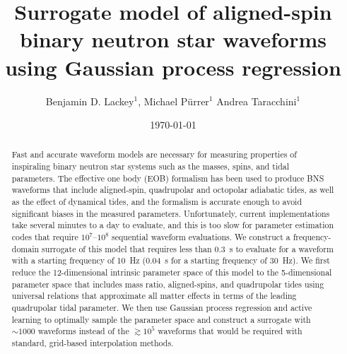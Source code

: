 \documentclass[prd,aps,letter,twocolumn,floatfix,notitlepage,nofootinbib]{revtex4-1}
\begin{document}
\title{Surrogate model of aligned-spin binary neutron star waveforms using Gaussian process regression}

\author{
Benjamin D. Lackey$^1$, 
Michael P\"{u}rrer$^1$
Andrea Taracchini$^1$
}

\date{\today}

\begin{abstract}

Fast and accurate waveform models are necessary for measuring properties of inspiraling binary neutron star systems such as the masses, spins, and tidal parameters. The effective one body (EOB) formalism has been used to produce BNS waveforms that include aligned-spin, quadrupolar and octopolar adiabatic tides, as well as the effect of dynamical tides, and the formalism is accurate enough to avoid significant biases in the measured parameters. Unfortunately, current implementations take several minutes to a day to evaluate, and this is too slow for parameter estimation codes that require $10^7$--$10^8$ sequential waveform evaluations. We construct a frequency-domain surrogate of this model that requires less than 0.3~s to evaluate for a waveform with a starting frequency of 10~Hz (0.04~s for a starting frequency of 30~Hz). We first reduce the 12-dimensional intrinsic parameter space of this model to the 5-dimensional parameter space that includes mass ratio, aligned-spins, and quadrupolar tides using universal relations that approximate all matter effects in terms of the leading quadrupolar tidal parameter. We then use Gaussian process regression and active learning to optimally sample the parameter space and construct a surrogate with $\sim 1000$ waveforms instead of the $\gtrsim 10^5$ waveforms that would be required with standard, grid-based interpolation methods. 



\end{abstract}

\end{document}
